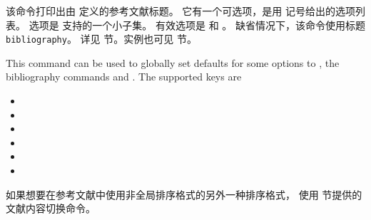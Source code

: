 \begin{ltxsyntax}
该命令打印出由  定义的参考文献标题。
它有一个可选项，是用 \keyval 记号给出的选项列表。
选项是  支持的一个小子集。
有效选项是  和 。
缺省情况下，该命令使用标题 \texttt{bibliography}。
详见  节。实例也可见  节。

This command can be used to globally set defaults for some options to , the  bibliography commands and .
The supported keys are
\begin{itemize}
  \item {}
  \item {}
  \item {}
  \item {}
  \item {}
  \item {}
\end{itemize}

\end{ltxsyntax}
%
如果想要在参考文献中使用非全局排序格式的另外一种排序格式，
使用  节提供的文献内容切换命令。

%
%
%
%
%
%
%




